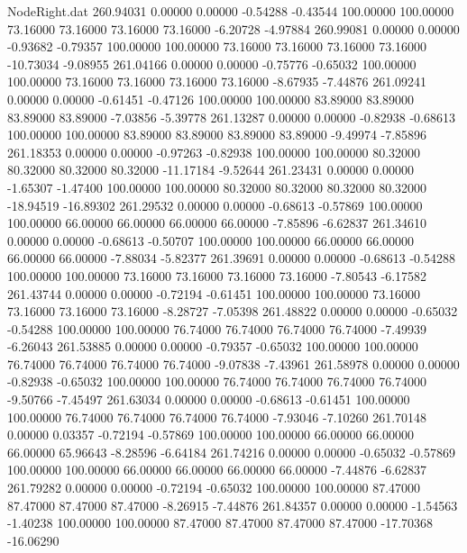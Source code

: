 \begin{filecontents}{NodeRight.dat}
 260.94031    0.00000    0.00000    -0.54288   -0.43544  100.00000  100.00000   73.16000   73.16000   73.16000   73.16000   -6.20728   -4.97884
 260.99081    0.00000    0.00000    -0.93682   -0.79357  100.00000  100.00000   73.16000   73.16000   73.16000   73.16000  -10.73034   -9.08955
 261.04166    0.00000    0.00000    -0.75776   -0.65032  100.00000  100.00000   73.16000   73.16000   73.16000   73.16000   -8.67935   -7.44876
 261.09241    0.00000    0.00000    -0.61451   -0.47126  100.00000  100.00000   83.89000   83.89000   83.89000   83.89000   -7.03856   -5.39778
 261.13287    0.00000    0.00000    -0.82938   -0.68613  100.00000  100.00000   83.89000   83.89000   83.89000   83.89000   -9.49974   -7.85896
 261.18353    0.00000    0.00000    -0.97263   -0.82938  100.00000  100.00000   80.32000   80.32000   80.32000   80.32000  -11.17184   -9.52644
 261.23431    0.00000    0.00000    -1.65307   -1.47400  100.00000  100.00000   80.32000   80.32000   80.32000   80.32000  -18.94519  -16.89302
 261.29532    0.00000    0.00000    -0.68613   -0.57869  100.00000  100.00000   66.00000   66.00000   66.00000   66.00000   -7.85896   -6.62837
 261.34610    0.00000    0.00000    -0.68613   -0.50707  100.00000  100.00000   66.00000   66.00000   66.00000   66.00000   -7.88034   -5.82377
 261.39691    0.00000    0.00000    -0.68613   -0.54288  100.00000  100.00000   73.16000   73.16000   73.16000   73.16000   -7.80543   -6.17582
 261.43744    0.00000    0.00000    -0.72194   -0.61451  100.00000  100.00000   73.16000   73.16000   73.16000   73.16000   -8.28727   -7.05398
 261.48822    0.00000    0.00000    -0.65032   -0.54288  100.00000  100.00000   76.74000   76.74000   76.74000   76.74000   -7.49939   -6.26043
 261.53885    0.00000    0.00000    -0.79357   -0.65032  100.00000  100.00000   76.74000   76.74000   76.74000   76.74000   -9.07838   -7.43961
 261.58978    0.00000    0.00000    -0.82938   -0.65032  100.00000  100.00000   76.74000   76.74000   76.74000   76.74000   -9.50766   -7.45497
 261.63034    0.00000    0.00000    -0.68613   -0.61451  100.00000  100.00000   76.74000   76.74000   76.74000   76.74000   -7.93046   -7.10260
 261.70148    0.00000    0.03357    -0.72194   -0.57869  100.00000  100.00000   66.00000   66.00000   66.00000   65.96643   -8.28596   -6.64184
 261.74216    0.00000    0.00000    -0.65032   -0.57869  100.00000  100.00000   66.00000   66.00000   66.00000   66.00000   -7.44876   -6.62837
 261.79282    0.00000    0.00000    -0.72194   -0.65032  100.00000  100.00000   87.47000   87.47000   87.47000   87.47000   -8.26915   -7.44876
 261.84357    0.00000    0.00000    -1.54563   -1.40238  100.00000  100.00000   87.47000   87.47000   87.47000   87.47000  -17.70368  -16.06290

\end{filecontents}
